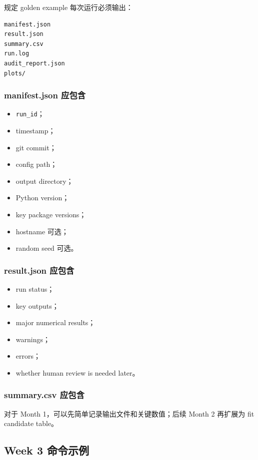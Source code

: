 \documentclass[11pt,a4paper,fontset=fandol]{ctexart}
\begin{document}
规定 golden example 每次运行必须输出：

\begin{lstlisting}
manifest.json
result.json
summary.csv
run.log
audit_report.json
plots/
\end{lstlisting}

\subsubsection{manifest.json 应包含}

\begin{itemize}[leftmargin=2em]
  \item \texttt{run\_id}；
  \item timestamp；
  \item git commit；
  \item config path；
  \item output directory；
  \item Python version；
  \item key package versions；
  \item hostname 可选；
  \item random seed 可选。
\end{itemize}

\subsubsection{result.json 应包含}

\begin{itemize}[leftmargin=2em]
  \item run status；
  \item key outputs；
  \item major numerical results；
  \item warnings；
  \item errors；
  \item whether human review is needed later。
\end{itemize}

\subsubsection{summary.csv 应包含}

对于 Month 1，可以先简单记录输出文件和关键数值；后续 Month 2 再扩展为 fit candidate table。

\subsection{Week 3 命令示例}
\end{document}
